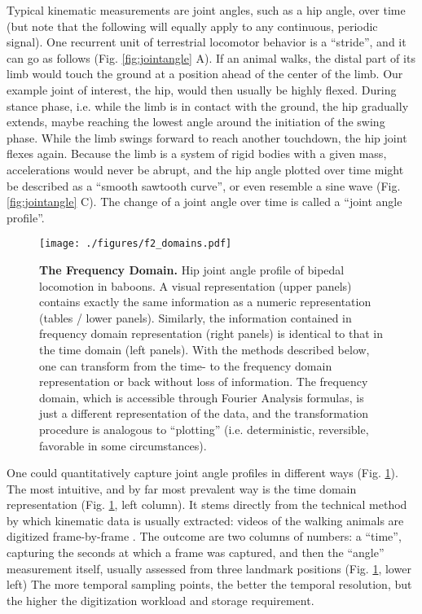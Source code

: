 Typical kinematic measurements are joint angles, such as a hip angle, over time (but note that the following will equally apply to any continuous, periodic signal).
One recurrent unit of terrestrial locomotor behavior is a ``stride'', and it can go as follows (Fig. \ref{fig:jointangle} A).
If an animal walks, the distal part of its limb would touch the ground at a position ahead of the center of the limb.
Our example joint of interest, the hip, would then usually be highly flexed.
During stance phase, i.e. while the limb is in contact with the ground, the hip gradually extends, maybe reaching the lowest angle around the initiation of the swing phase.
While the limb swings forward to reach another touchdown, the hip joint flexes again.
Because the limb is a system of rigid bodies with a given mass, accelerations would never be abrupt, and the hip angle plotted over time might be described as a ``smooth sawtooth curve'', or even resemble a sine wave (Fig. \ref{fig:jointangle} C).
The change of a joint angle over time is called a ``joint angle profile''.


\begin{figure}[pb]
\centering
\texttt{[image: ./figures/f2\_domains.pdf]}
\caption{\label{fig:domains}\textbf{The Frequency Domain.} Hip joint angle profile of bipedal locomotion in baboons. A visual representation (upper panels) contains exactly the same information as a numeric representation (tables / lower panels). Similarly, the information contained in frequency domain representation (right panels) is identical to that in the time domain (left panels). With the methods described below, one can transform from the time- to the frequency domain representation or back without loss of information. The frequency domain, which is accessible through Fourier Analysis formulas, is just a different representation of the data, and the transformation procedure is analogous to ``plotting'' (i.e. deterministic, reversible, favorable in some circumstances).}
\end{figure}


One could quantitatively capture joint angle profiles in different ways (Fig. \ref{fig:domains}).
The most intuitive, and by far most prevalent way is the time domain representation (Fig. \ref{fig:domains}, left column).
It stems directly from the technical method by which kinematic data is usually extracted: videos of the walking animals are digitized frame-by-frame \citep[\textit{cf.}][]{MMielke2020}.
The outcome are two columns of numbers: a ``time'', capturing the seconds at which a frame was captured, and then the ``angle'' measurement itself, usually assessed from three landmark positions (Fig. \ref{fig:domains}, lower left)
The more temporal sampling points, the better the temporal resolution, but the higher the digitization workload and storage requirement.


